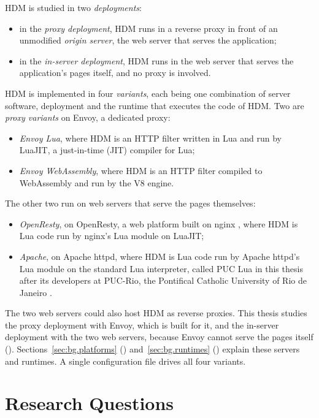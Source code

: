 \documentclass{rptuma}
\begin{document}
HDM is studied in two \emph{deployments}:
\begin{itemize}
  \item in the \emph{proxy deployment}, HDM runs in a reverse proxy in front of an unmodified
    \emph{origin server}, the web server that serves the application;
  \item in the \emph{in-server deployment}, HDM runs in the web server that serves the
    application's pages itself, and no proxy is involved.
\end{itemize}
HDM is implemented in four \emph{variants}, each being one combination of server software, deployment and
the runtime that executes the code of HDM. Two are \emph{proxy variants} on Envoy, a dedicated
proxy:
\begin{itemize}
  \item \emph{Envoy Lua}, where HDM is an HTTP filter written in Lua and run by LuaJIT, a
    just-in-time (JIT) compiler for Lua;
  \item \emph{Envoy WebAssembly}, where HDM is an HTTP filter compiled to WebAssembly and run by the
    V8 engine.
\end{itemize}
The other two run on web servers that serve the pages themselves:
\begin{itemize}
  \item \emph{OpenResty}, on OpenResty, a web platform built on nginx
    \cite{openresty_about}, where HDM is Lua code run by nginx's Lua module on LuaJIT;
  \item \emph{Apache}, on Apache httpd, where HDM is Lua code run by Apache httpd's Lua
    module on the standard Lua interpreter, called PUC Lua in this thesis after its
    developers at PUC-Rio, the Pontifical Catholic University of Rio de Janeiro \cite{lua_about}.
\end{itemize}
The two web servers could also host HDM as reverse proxies. This thesis studies the proxy
deployment with Envoy, which is built for it, and the in-server deployment with the two web servers,
because Envoy cannot serve the pages itself ().
Sections~\ref{sec:bg.platforms} (\emph{}) and~\ref{sec:bg.runtimes} (\emph{}) explain these servers and runtimes.
A single configuration file drives all four variants.

\section{Research Questions}
\label{sec:AB.rq}
\end{document}
